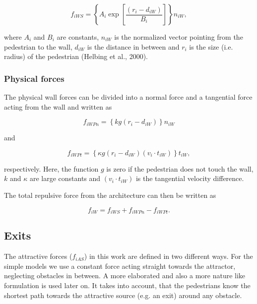 \documentclass[11pt]{article}
\begin{document}
\begin{equation}
	{f_{iWS}} = \left\{ {{A_i}\exp \left[ {\frac{{\left( {{r_i} - {d_{iW}}} \right)}}{{{B_i}}}} \right]} \right\}{n_{iW}} ,
	\label{eq:fiWS}
\end{equation}

where $A_i$ and $B_i$ are constants, $n_{iW}$ is the normalized vector pointing from the pedestrian to the wall, $d_{iW}$ is the distance in between and $r_i$ is the size (i.e. radius) of the pedestrian (Helbing et al., 2000).

\subsubsection{Physical forces}

The physical wall forces can be divided into a normal force and a tangential force acting from the wall and written as

\begin{equation}
	{f_{iWPn}} = \left\{ {kg\left( {{r_i} - {d_{iW}}} \right)} \right\}{n_{iW}}
	\label{eq:fiWPn}
\end{equation}

and

\begin{equation}
	{f_{iWPt}} = \left\{ {\kappa g\left( {{r_i} - {d_{iW}}} \right)\left( {{v_i} \cdot {t_{iW}}} \right)} \right\}{t_{iW}} ,
	\label{eq:fiWPt}
\end{equation}

respectively. Here, the function $g$ is zero if the pedestrian does not touch the wall, $k$ and $\kappa$ are large constants and $(v_i \cdot t_{iW})$ is the tangential velocity difference.

The total repulsive force from the architecture can then be written as

\begin{equation}
	{f_{iW}} = {f_{iWS}} + {f_{iWPn}} - {f_{iWPt}} .
	\label{eq:fiW}
\end{equation}



\subsection{Exits}
\label{sec:Exits1}

The attractive forces ($f_{iAS}$) in this work are defined in two different ways. For the simple models we use a constant force acting straight towards the attractor, neglecting obstacles in between. A more elaborated and also a more nature like formulation is used later on. It takes into account, that the pedestrians know the shortest path towards the attractive source (e.g. an exit) around any obstacle.
\end{document}
